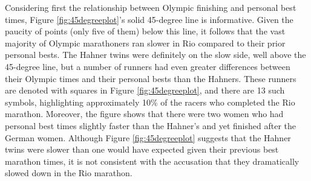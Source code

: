 \documentclass[12pt,titlepage]{article}
\begin{document}
Considering first the relationship between Olympic finishing and
personal best times, Figure \ref{fig:45degreeplot}'s solid 45-degree
line is informative.  Given the paucity of points (only five of them)
below this line, it follows that the vast majority of Olympic
marathoners ran slower in Rio compared to their prior personal bests.
The Hahner twins were definitely on the slow side, well above the 45-degree line,
but a number of runners had even greater differences between
their Olympic times and their personal bests than the Hahners.  These
runners are denoted with squares in Figure \ref{fig:45degreeplot}, and
there are 13 such symbols, highlighting approximately 10\% of the
racers who completed the Rio marathon.  Moreover, the figure shows
that there were two women who had personal best times slightly faster
than the Hahner's and yet finished after the German women.  Although
Figure \ref{fig:45degreeplot} suggests that the Hahner twins were
slower than one would have expected given their previous best marathon
times, it is not consistent with the accusation that they dramatically
slowed down in the Rio marathon.

\end{document}

